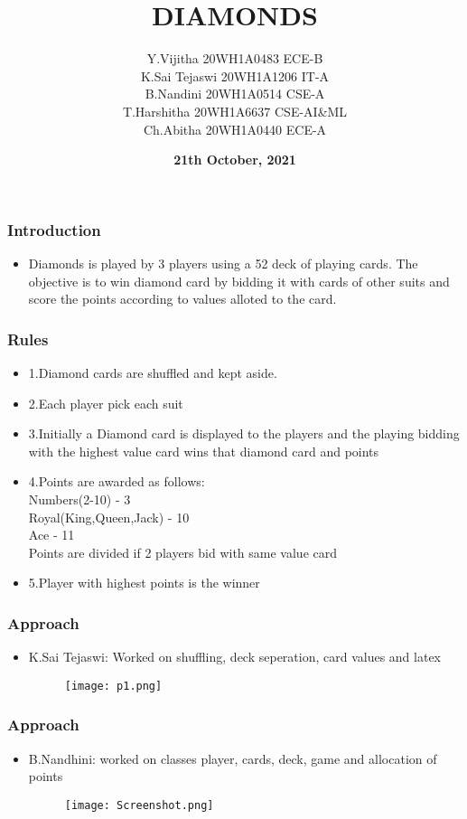 \documentclass[12pt]{beamer}
\title{\textbf{DIAMONDS}}
\author[Bvrith]{Y.Vijitha 20WH1A0483 ECE-B\\K.Sai Tejaswi 20WH1A1206 IT-A\\ B.Nandini 20WH1A0514 CSE-A\\ T.Harshitha 20WH1A6637 CSE-AI&ML\\ Ch.Abitha 20WH1A0440 ECE-A}
\date{\textbf{21th October, 2021}}
\begin{document}
    \begin{frame}
        \titlepage
    \end{frame}
    \begin{frame}
	\frametitle{Introduction}
        \begin{itemize}
	    \item Diamonds is played by 3 players using a 52 deck of playing cards. The objective is to win diamond card by bidding it with cards of other suits and score the points according to values alloted to the card.
	\end{itemize}
    \end{frame}
    \begin{frame}
	\frametitle{Rules}
	\begin{itemize}
	    \item 1.Diamond cards are shuffled and kept aside.
	    \item 2.Each player pick each suit
	    \item 3.Initially  a Diamond card is displayed to the players and the playing bidding with the highest value card wins that diamond card and points
	    \item 4.Points are awarded as follows:\\
	    Numbers(2-10) - 3\\
	    Royal(King,Queen,Jack) - 10\\
	    Ace - 11\\
	    Points are divided if 2 players bid with same value card
	    \item 5.Player with highest points is the winner  
	    
	\end{itemize}
    \end{frame}
    \begin{frame}
	\frametitle{Approach}
	\begin{itemize}
	    \item K.Sai Tejaswi: Worked on shuffling, deck seperation, card values and latex\\
	    \begin{figure}
\texttt{[image: p1.png]}
\end{figure}

	\end{itemize}
    \end{frame}
    \begin{frame}
	\frametitle{Approach}
	\begin{itemize}
	    \item B.Nandhini: worked on classes player, cards, deck, game and allocation of points\\
	    \begin{figure}
\texttt{[image: Screenshot.png]}
\end{figure}
	    \end{itemize}
	    \end{frame}
\end{document}
